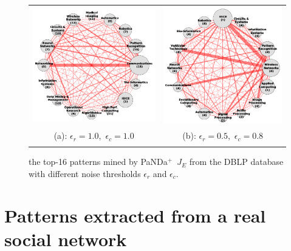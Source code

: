 \documentclass{article}
\newcommand{\myalgostyle}[1]  {{\sc #1}\xspace}
\newcommand{\pandaplus}        {\myalgostyle{PaNDa$^+$}}
\begin{document}
\begin{figure}
\begin{tabular}{cc}
\includegraphics{dblp_graph_x_0_5_1_0_1_0.png} &
\includegraphics{dblp_graph_x_0_5_0_5_0_8.png} \\
(a): $\epsilon_{r} = 1.0$,\ $\epsilon_{c}=1.0$ & (b): $\epsilon_{r} = 0.5$,\ $\epsilon_{c}=0.8$ \\
\multicolumn{2}{c}{\caption{\label{fig:DBLP} the top-16 patterns mined by \pandaplus~$J_{E}$ 
from the DBLP database with different noise thresholds $\epsilon_{r}$ 
and $\epsilon_{c}$.}}
\end{tabular}
\end{figure}

\section{Patterns extracted from a real social network}
\end{document}
